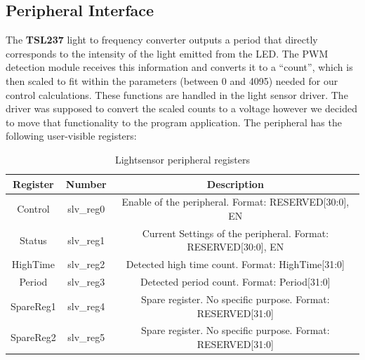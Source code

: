 \documentclass[11pt]{article}
\begin{document}
\subsection{Peripheral Interface}
The \textbf{TSL237} light to frequency converter outputs a period that directly corresponds to the intensity of the light emitted from the LED.  The PWM detection module receives this information and converts it to a ``count'', which is then scaled to fit within the parameters (between 0 and 4095) needed for our control calculations.  These functions are handled in the light sensor driver.  The driver was supposed to convert the scaled counts to a voltage however we decided to move that functionality to the program application.
The peripheral has the following user-visible registers:
	\begin {table}[h!]
	\begin {center} 
	\vspace{15pt}
	
	\begin{tabular}{||c|c|c||}\hline
		\textbf{Register}	&	\textbf{Number}	&	\textbf{Description}		\\\hline
		Control				&	slv_reg0		&	Enable of the peripheral. Format: {RESERVED[30:0], EN}		\\\hline
		Status				&	slv_reg1		&	Current Settings of the peripheral. Format: {RESERVED[30:0], EN}		\\\hline
		HighTime			&	slv_reg2		&	Detected high time count. Format: HighTime[31:0]			\\\hline
		Period				&	slv_reg3		&	Detected period count. Format: Period[31:0]			\\\hline
		SpareReg1			&	slv_reg4		&	Spare register. No specific purpose. Format: RESERVED[31:0]			\\\hline
		SpareReg2			&	slv_reg5		&	Spare register. No specific purpose. Format: RESERVED[31:0]			\\\hline
	\end{tabular}
		\caption {Lightsensor peripheral registers} \label{registers}
	\end{center}
	\end{table} 
	
\end{document}
